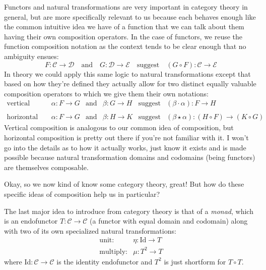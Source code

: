 \documentclass[twoside]{article}
\begin{document}
Functors and natural transformations are very important in category theory in general, but are more specifically relevant
to us because each behaves enough like the common intuitive idea we have of a function that we can talk about them having
their own composition operators. In the case of functors, we reuse the function composition notation as the context tends
to be clear enough that no ambiguity ensues:
$$ F:\mathcal{C}\to\mathcal{D} \quad \mbox{and} \quad G:\mathcal{D}\to\mathcal{E}
\quad \mbox{suggest} \quad (G\circ F):\mathcal{C}\to\mathcal{E} $$
In theory we could apply this same logic to natural transformations except that based on how they're defined they
actually allow for two distinct equally valuable composition operators to which we give them their own notations:
$$ \begin{array}{rrclcl}
\mbox{vertical composition:} & \alpha:F\to G & \mbox{and} & \beta:G\to H & \mbox{suggest} & (\beta\cdot\alpha):F\to H		\\
																\\
\mbox{horizontal composition:} & \alpha:F\to G & \mbox{and} &
\beta:H\to K & \mbox{suggest} & (\beta\star\alpha):(H\circ F)\to (K\circ G)
\end{array} $$
Vertical composition is analogous to our common idea of composition, but horizontal composition is pretty out there
if you're not familiar with it. I won't go into the details as to how it actually works, just know it exists and is
made possible because natural transformation domains and codomains (being functors) are themselves composable.

Okay, so we now kind of know some category theory, great! But how do these specific ideas of composition help us in particular?

The last major idea to introduce from category theory is that of a \emph{monad}, which is an endofunctor
$ T:\mathcal{C}\to\mathcal{C} $ (a functor with equal domain and codomain) along with two of its own
specialized natural transformations:
$$ \begin{array}{rlcl}
\mbox{unit:}		& \eta:\mbox{Id}\to T		\\
\mbox{multiply:}	& \mu:T^2\to T
\end{array} $$
where Id$ : \mathcal{C}\to\mathcal{C} $ is the identity endofunctor and $ T^2 $ is just shortform for $ T\circ T $.
\end{document}
